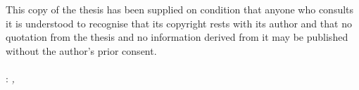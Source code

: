 \thispagestyle{empty}

\hfill

\vfill

This copy of the thesis has been supplied on condition that anyone who consults it is understood to recognise that its copyright rests with its author and that no quotation from the thesis and no information derived from it may be published without the author's prior consent.
\\\\
\noindent\myName: \textit{\myTitle,} %
\textcopyright\ \myTime

%
%
%
%
%
